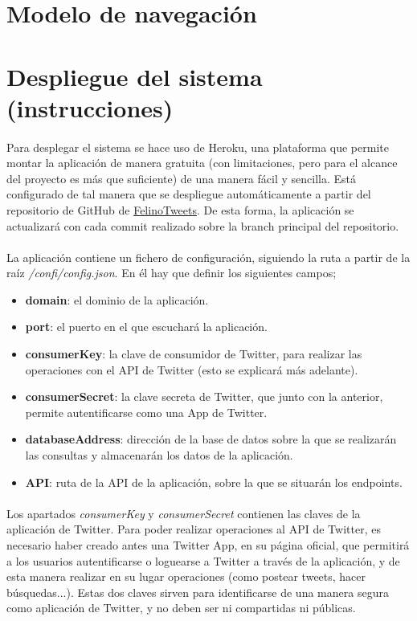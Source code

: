 \documentclass[a4paper]{article}
\begin{document}
\section{Modelo de navegación}

\section{Despliegue del sistema (instrucciones)}
\paragraph{}Para desplegar el sistema se hace uso de Heroku, una plataforma que permite montar la aplicación de manera gratuita (con limitaciones, pero para el alcance del proyecto es más que suficiente) de una manera fácil y sencilla. Está configurado de tal manera que se despliegue automáticamente a partir del repositorio de GitHub de \href{https://github.com/FelinoSoft/FelinoTweets}{FelinoTweets}. De esta forma, la aplicación se actualizará con cada commit realizado sobre la branch principal del repositorio.
\paragraph{}La aplicación contiene un fichero de configuración, siguiendo la ruta a partir de la raíz \textit{/confi/config.json}. En él hay que definir los siguientes campos;
\begin{itemize}
\item \textbf{domain}: el dominio de la aplicación.
\item \textbf{port}: el puerto en el que escuchará la aplicación.
\item \textbf{consumerKey}: la clave de consumidor de Twitter, para realizar las operaciones con el API de Twitter (esto se explicará más adelante).
\item \textbf{consumerSecret}: la clave secreta de Twitter, que junto con la anterior, permite autentificarse como una App de Twitter.
\item \textbf{databaseAddress}: dirección de la base de datos sobre la que se realizarán las consultas y almacenarán los datos de la aplicación.
\item \textbf{API}: ruta de la API de la aplicación, sobre la que se situarán los endpoints.
\end{itemize}

\paragraph{}Los apartados \textit{consumerKey} y \textit{consumerSecret} contienen las claves de la aplicación de Twitter. Para poder realizar operaciones al API de Twitter, es necesario haber creado antes una Twitter App, en su página oficial, que permitirá a los usuarios autentificarse o loguearse a Twitter a través de la aplicación, y de esta manera realizar en su lugar operaciones (como postear tweets, hacer búsquedas...). Estas dos claves sirven para identificarse de una manera segura como aplicación de Twitter, y no deben ser ni compartidas ni públicas.
\end{document}
